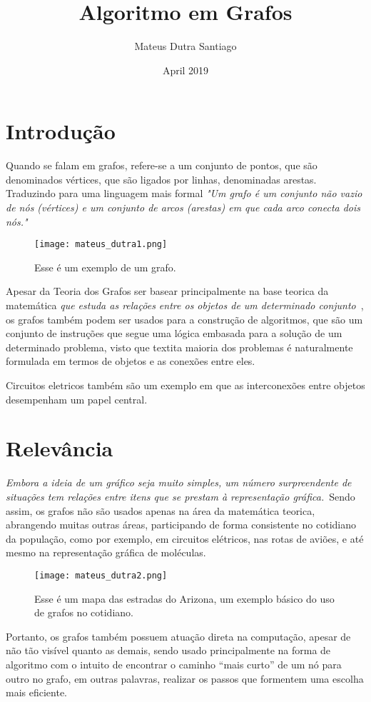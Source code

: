 \documentclass[a4paper, 10pt]{article}
\title{ Algoritmo em Grafos}
\author{Mateus Dutra Santiago}
\date{April 2019}
\begin{document}
\maketitle

\section{Introdução}
\quad Quando se falam em grafos, refere-se a um conjunto de pontos, que são denominados vértices, que são ligados por linhas, denominadas arestas. Traduzindo para uma linguagem mais formal \textit{"Um grafo é um conjunto não vazio de nós (vértices) e um conjunto de arcos (arestas) em que
cada arco conecta dois nós."~\cite{J}}
\begin{figure}[!htb]
    \center
    \texttt{[image: mateus\_dutra1.png]}
    \caption{\label{fig:my-label} Esse é um exemplo de um grafo.}
\end{figure}

\quad Apesar da Teoria dos Grafos ser basear principalmente na base teorica da matemática \textit{que estuda as relações entre os objetos de um determinado conjunto}~\cite{tg}, os grafos também podem ser usados para a construção de algoritmos, que são um conjunto de instruções que segue uma lógica embasada para a solução de um determinado problema, visto que textit{a maioria dos problemas é naturalmente formulada em termos de objetos e as conexões entre eles.}~\cite{RS}

\quad Circuitos eletricos também são um exemplo em que as interconexões entre objetos desempenham um papel central.
\section{Relevância}
\quad \textit{Embora a ideia de um gráfico seja muito simples, um número surpreendente de situações tem relações entre itens que se prestam à representação gráfica.}~\cite{J}Sendo assim, os grafos não são usados apenas na área da matemática teorica, abrangendo muitas outras áreas, participando de forma consistente no cotidiano da população, como por exemplo, em circuitos elétricos, nas rotas de aviões, e até mesmo na representação gráfica de moléculas.
\begin{figure}[H]
    \centering
    \texttt{[image: mateus\_dutra2.png]}
    \caption{\label{fig:arizona} Esse é um mapa das estradas do Arizona, um exemplo básico do uso de grafos no cotidiano.}
\end{figure}
\quad Portanto, os grafos também possuem atuação direta na computação, apesar de não tão visível quanto as demais, sendo usado principalmente na forma de algoritmo com o intuito de encontrar o caminho “mais curto” de um nó para outro no grafo, em outras palavras, realizar os passos que formentem uma escolha mais eficiente.
\end{document}
